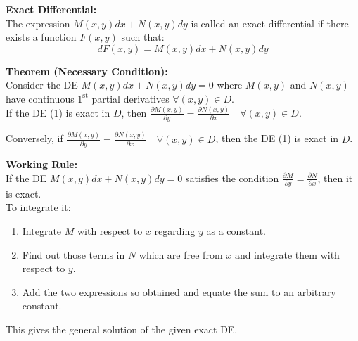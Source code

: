 \documentclass[11pt,a4paper]{article}
\begin{document}
\textbf{\textcolor{DeepNavy}{Exact Differential:}} \\
The expression $M(x,y)dx + N(x,y)dy$ is called an exact differential if there exists a function $F(x,y)$ such that:
\[ dF(x,y) = M(x,y)dx + N(x,y)dy \]

\textbf{\textcolor{DeepNavy}{Theorem (Necessary Condition):}} \\
Consider the DE $M(x,y)dx + N(x,y)dy = 0$ where $M(x,y)$ and $N(x,y)$ have continuous $1^{\text{st}}$ partial derivatives $\forall (x,y) \in D$. \\
If the DE (1) is exact in $D$, then $\frac{\partial M(x,y)}{\partial y} = \frac{\partial N(x,y)}{\partial x} \quad \forall (x,y) \in D$.

Conversely, if $\frac{\partial M(x,y)}{\partial y} = \frac{\partial N(x,y)}{\partial x} \quad \forall (x,y) \in D$, then the DE (1) is exact in $D$.

\vspace{0.2cm}
\noindent\textbf{\textcolor{DeepNavy}{Working Rule:}} \\
If the DE $M(x,y)dx + N(x,y)dy = 0$ satisfies the condition $\frac{\partial M}{\partial y} = \frac{\partial N}{\partial x}$, then it is exact. \\
To integrate it:
\begin{enumerate}
    \item Integrate $M$ with respect to $x$ regarding $y$ as a constant.
    \item Find out those terms in $N$ which are free from $x$ and integrate them with respect to $y$.
    \item Add the two expressions so obtained and equate the sum to an arbitrary constant.
\end{enumerate}
This gives the general solution of the given exact DE.
\end{document}
